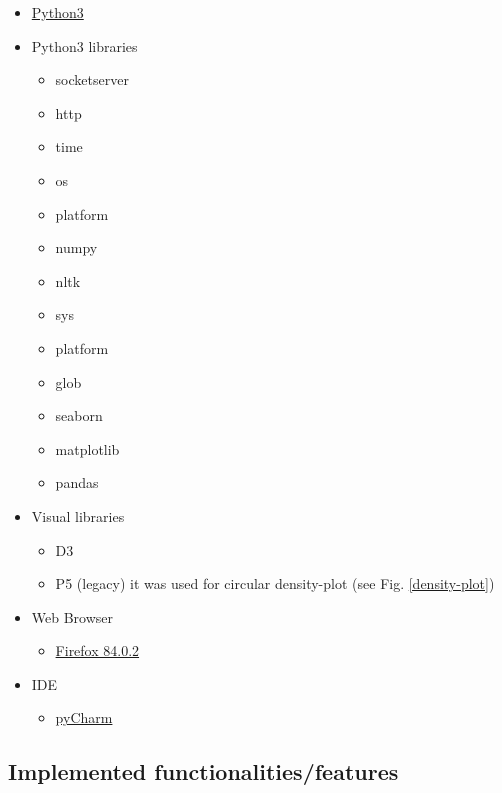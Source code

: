 \documentclass[runningheads]{llncs}
\begin{document}
\begin{itemize}
    \item \href{https://www.python.org/downloads/}{Python3}
    \item Python3 libraries
    \begin{itemize}
        \item socketserver
        \item http
        \item time
        \item os
        \item platform
        \item numpy
        \item nltk
        \item sys
        \item platform
        \item glob
        \item seaborn
        \item matplotlib
        \item pandas
    \end{itemize}
    \item Visual libraries 
    \begin{itemize}
        \item D3
        \item P5 (legacy) it was used for circular density-plot (see Fig. \ref{density-plot})
    \end{itemize}
    \item Web Browser
    \begin{itemize}
        \item \href{https://www.mozilla.org/de/firefox/new/}{Firefox 84.0.2}
    \end{itemize}
    \item IDE
    \begin{itemize}
        \item \href{https://www.jetbrains.com/de-de/pycharm/}{pyCharm}
    \end{itemize}
\end{itemize}


\subsection{Implemented functionalities/features}
\end{document}
